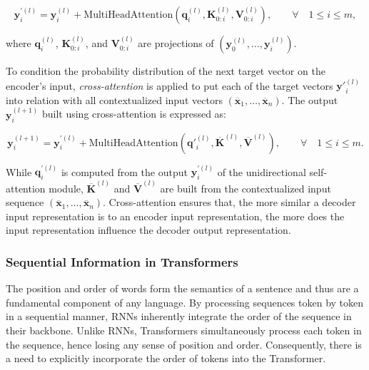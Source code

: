 \begin{equation}
    \bm{y}^{\prime(l)}_i = \bm{y}^{(l)}_i + \textrm{MultiHeadAttention}\left(\bm{q}^{(l)}_i, \bm{K}^{(l)}_{0:i}, \bm{V}^{(l)}_{0:i}\right), \qquad \forall \quad 1 \leq i \leq m,
\end{equation}

\noindent where $\bm{q}^{(l)}_i$, $\bm{K}^{(l)}_{0:i}$, and $\bm{V}^{(l)}_{0:i}$ are projections of $(\bm{y}^{(l)}_0, \ldots, \bm{y}^{(l)}_i)$.

To condition the probability distribution of the next target vector on the encoder's input, \textit{cross-attention} is applied to put each of the target vectors $\bm{y}'^{(l)}_i$ into relation with all contextualized input vectors $(\overline{\bm{x}}_1, \ldots, \overline{\bm{x}}_n)$. The output $\bm{y}^{(l+1)}_i$ built using cross-attention is expressed as:

\begin{equation}
    \bm{y}^{(l+1)}_i = \bm{y}^{\prime(l)}_i + \textrm{MultiHeadAttention}\left(\bm{q}'^{(l)}_i, \overline{\bm{K}}^{(l)}, \overline{\bm{V}}^{(l)}\right), \qquad \forall \quad 1 \leq i \leq m.
\end{equation}

\noindent While $\bm{q}^{\prime(l)}_i$ is computed from the output $\bm{y}^{\prime(l)}_i$ of the unidirectional self-attention module, $\overline{\bm{K}}^{(l)}$ and $\overline{\bm{V}}^{(l)}$ are built from the contextualized input sequence $(\overline{\bm{x}}_1, \ldots, \overline{\bm{x}}_n)$. Cross-attention ensures that, the more similar a decoder input representation is to an encoder input representation, the more does the input representation influence the decoder output representation.



\subsubsection{Sequential Information in Transformers}

The position and order of words form the semantics of a sentence and thus are a fundamental component of any language. By processing sequences token by token in a sequential manner, \acp{RNN} inherently integrate the order of the sequence in their backbone. Unlike \acp{RNN}, Transformers simultaneously process each token in the sequence, hence losing any sense of position and order. Consequently, there is a need to explicitly incorporate the order of tokens into the Transformer.

